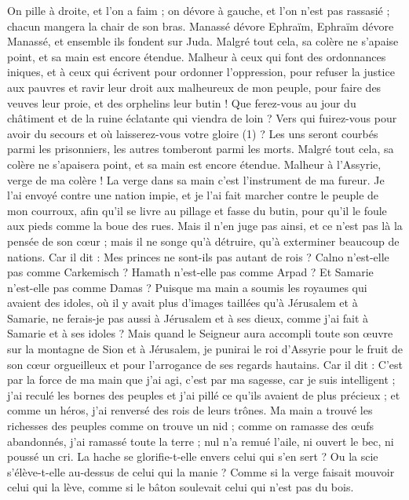 \begin{multicols}{2}
On pille à droite, et l’on a faim ; on dévore à gauche, et l’on n’est pas rassasié ; chacun mangera la chair de son bras.
Manassé dévore Ephraïm, Ephraïm dévore Manassé, et ensemble ils fondent sur Juda. Malgré tout cela, sa colère ne s’apaise point, et sa main est encore étendue.
\VerseOne{}Malheur à ceux qui font des ordonnances iniques, et à ceux qui écrivent pour ordonner l'oppression,
pour refuser la justice aux pauvres et ravir leur droit aux malheureux de mon peuple, pour faire des veuves leur proie, et des orphelins leur butin !
Que ferez-vous au jour du châtiment et de la ruine éclatante qui viendra de loin ? Vers qui fuirez-vous pour avoir du secours et où laisserez-vous votre gloire (1) ?
Les uns seront courbés parmi les prisonniers, les autres tomberont parmi les morts. Malgré tout cela, sa colère ne s’apaisera point, et sa main est encore étendue.
Malheur à l’Assyrie, verge de ma colère ! La verge dans sa main c’est l’instrument de ma fureur.
Je l’ai envoyé contre une nation impie, et je l’ai fait marcher contre le peuple de mon courroux, afin qu'il se livre au pillage et fasse du butin, pour qu’il le foule aux pieds comme la boue des rues.
Mais il n’en juge pas ainsi, et ce n’est pas là la pensée de son cœur ; mais il ne songe qu’à détruire, qu’à exterminer beaucoup de nations.
Car il dit : Mes princes ne sont-ils pas autant de rois ?
Calno n'est-elle pas comme Carkemisch ? Hamath n'est-elle pas comme Arpad ? Et Samarie n'est-elle pas comme Damas ?
Puisque ma main a soumis les royaumes qui avaient des idoles, où il y avait plus d’images taillées qu’à Jérusalem et à Samarie,
ne ferais-je pas aussi à Jérusalem et à ses dieux, comme j'ai fait à Samarie et à ses idoles ?
Mais quand le Seigneur aura accompli toute son œuvre sur la montagne de Sion et à Jérusalem, je punirai le roi d'Assyrie pour le fruit de son cœur orgueilleux et pour l’arrogance de ses regards hautains.
Car il dit : C’est par la force de ma main que j’ai agi, c’est par ma sagesse, car je suis intelligent ; j'ai reculé les bornes des peuples et j'ai pillé ce qu'ils avaient de plus précieux ; et comme un héros, j'ai renversé des rois de leurs trônes.
Ma main a trouvé les richesses des peuples comme on trouve un nid ; comme on ramasse des œufs abandonnés, j’ai ramassé toute la terre ; nul n’a remué l’aile, ni ouvert le bec, ni poussé un cri.
La hache se glorifie-t-elle envers celui qui s’en sert ? Ou la scie s’élève-t-elle au-dessus de celui qui la manie ? Comme si la verge faisait mouvoir celui qui la lève, comme si le bâton soulevait celui qui n’est pas du bois.

\end{multicols}
